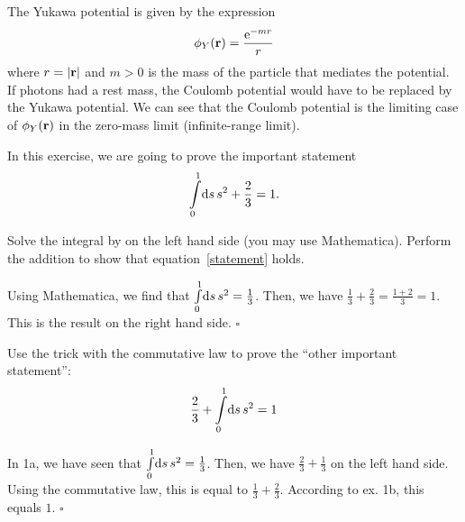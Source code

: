 \documentclass{assignment}
\begin{document}
The Yukawa potential is given by the expression
\begin{align}
    \phi_Y(\mathbf{r}) = \frac{\operatorname{e}^{-mr}}{r}
\end{align}
where $r=|\mathbf{r}|$ and $m > 0$ is the mass of the particle that mediates
the potential. If photons had a rest mass, the Coulomb potential would
have to be replaced by the Yukawa potential. We can see that the Coulomb
potential is the limiting case of $\phi_Y(\mathbf{r})$ in the zero-mass
limit (infinite-range limit).

\begin{exercises}

In this exercise, we are going to prove the important statement
\begin{align}
    \int\limits_{0}^{1} \! \mathrm{d} s\, s^2 + \frac{2}{3} = 1.  \label{statement}
\end{align}
\begin{tasks}
    \task Solve the integral by on the left hand side (you may use
          Mathematica).
    \task Perform the addition to show that equation~\eqref{statement}
          holds.
\end{tasks}

\begin{solution}
    \begin{tasks}
        \task Using Mathematica, we find that $\int\limits_{0}^{1} \! \mathrm{d} s\, s^2 = \frac{1}{3}$.
        \task Then, we have $\frac{1}{3} + \frac{2}{3} = \frac{1+2}{3} = 1$. This is the
              result on the right hand side. $\square$
    \end{tasks}
\end{solution}

Use the trick with the commutative law to prove the ``other important statement'':
\begin{align}
    \frac{2}{3} + \int\limits_{0}^{1} \! \mathrm{d} s\, s^2 = 1
    \label{otherStatement}
\end{align}

\begin{solution}
    In 1a, we have seen that $\int\limits_{0}^{1} \! \mathrm{d} s\, s^2 = \frac{1}{3}$.
    Then, we have $\frac{2}{3} + \frac{1}{3}$ on the left hand side. Using the
    commutative law, this is equal to $\frac{1}{3} + \frac{2}{3}$. According
    to ex. 1b, this equals $1$. $\square$
\end{solution}

\end{exercises}
\end{document}
